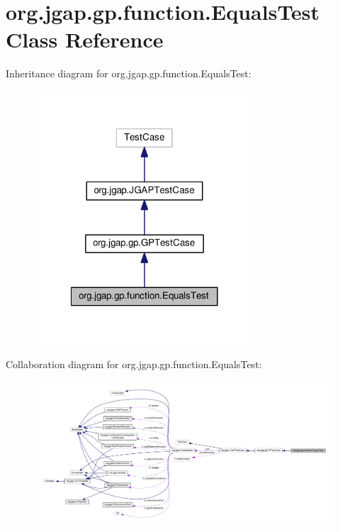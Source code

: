 \hypertarget{classorg_1_1jgap_1_1gp_1_1function_1_1_equals_test}{\section{org.\-jgap.\-gp.\-function.\-Equals\-Test Class Reference}
\label{classorg_1_1jgap_1_1gp_1_1function_1_1_equals_test}
}


Inheritance diagram for org.\-jgap.\-gp.\-function.\-Equals\-Test\-:
\nopagebreak
\begin{figure}[H]
\begin{center}
\leavevmode
\includegraphics[width=234pt]{classorg_1_1jgap_1_1gp_1_1function_1_1_equals_test__inherit__graph}
\end{center}
\end{figure}


Collaboration diagram for org.\-jgap.\-gp.\-function.\-Equals\-Test\-:
\nopagebreak
\begin{figure}[H]
\begin{center}
\leavevmode
\includegraphics[width=350pt]{classorg_1_1jgap_1_1gp_1_1function_1_1_equals_test__coll__graph}
\end{center}
\end{figure}
